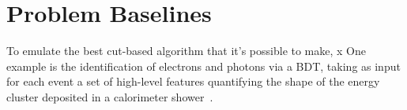\section{Problem Baselines}

To emulate the best cut-based algorithm that it's possible to make, x One example is the identification of electrons and photons via a BDT, taking as input for each event a set of high-level features quantifying the shape of the energy cluster deposited in a calorimeter shower~\cite{BDT_thesis}.

